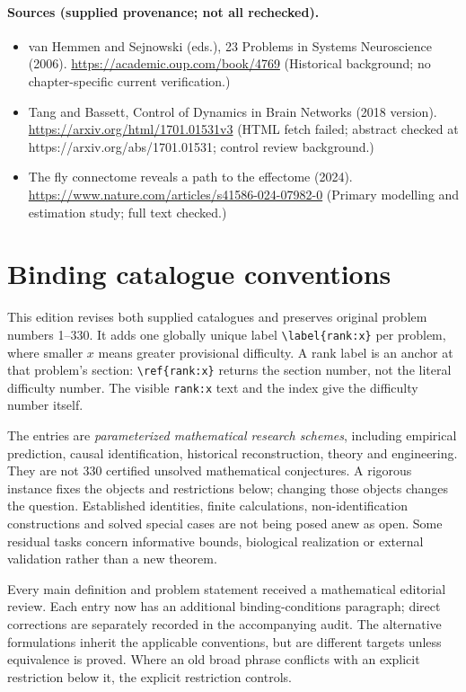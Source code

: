 \documentclass[11pt]{article}
\begin{document}
\paragraph{Sources (supplied provenance; not all rechecked).} \begin{itemize}
\item van Hemmen and Sejnowski (eds.), 23 Problems in Systems Neuroscience (2006). \url{https://academic.oup.com/book/4769} (Historical background; no chapter-specific current verification.)
\item Tang and Bassett, Control of Dynamics in Brain Networks (2018 version). \url{https://arxiv.org/html/1701.01531v3} (HTML fetch failed; abstract checked at https://arxiv.org/abs/1701.01531; control review background.)
\item The fly connectome reveals a path to the effectome (2024). \url{https://www.nature.com/articles/s41586-024-07982-0} (Primary modelling and estimation study; full text checked.)
\end{itemize}


\section*{Binding catalogue conventions}
This edition revises both supplied catalogues and preserves original problem numbers 1--330. It adds one globally unique label \verb|\label{rank:x}| per problem, where smaller $x$ means greater provisional difficulty. A rank label is an anchor at that problem's section: \verb|\ref{rank:x}| returns the section number, not the literal difficulty number. The visible \texttt{rank:x} text and the index give the difficulty number itself.

The entries are \emph{parameterized mathematical research schemes}, including empirical prediction, causal identification, historical reconstruction, theory and engineering. They are not 330 certified unsolved mathematical conjectures. A rigorous instance fixes the objects and restrictions below; changing those objects changes the question. Established identities, finite calculations, non-identification constructions and solved special cases are not being posed anew as open. Some residual tasks concern informative bounds, biological realization or external validation rather than a new theorem.

Every main definition and problem statement received a mathematical editorial review. Each entry now has an additional binding-conditions paragraph; direct corrections are separately recorded in the accompanying audit. The alternative formulations inherit the applicable conventions, but are different targets unless equivalence is proved. Where an old broad phrase conflicts with an explicit restriction below it, the explicit restriction controls.
\end{document}
